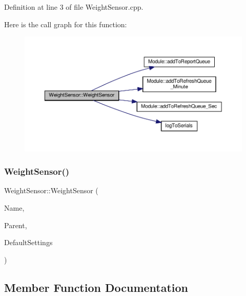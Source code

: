 Definition at line 3 of file Weight\+Sensor.\+cpp.

Here is the call graph for this function\+:
\nopagebreak
\begin{figure}[H]
\begin{center}
\leavevmode
\includegraphics[width=350pt]{class_weight_sensor_a7ea36c43abb037e5d88f6d181bd07b0d_cgraph}
\end{center}
\end{figure}
\mbox{\label{class_weight_sensor_a7ea36c43abb037e5d88f6d181bd07b0d}} 
\subsubsection{\texorpdfstring{Weight\+Sensor()}{WeightSensor()}\hspace{0.1cm}{\footnotesize\ttfamily [2/2]}}
{\footnotesize\ttfamily Weight\+Sensor\+::\+Weight\+Sensor (\begin{DoxyParamCaption}\item[{const \+\_\+\+\_\+\+Flash\+String\+Helper $\ast$}]{Name,  }\item[{\hyperlink{class_module}{Module} $\ast$}]{Parent,  }\item[{\hyperlink{struct_settings_1_1_weight_sensor_settings}{Settings\+::\+Weight\+Sensor\+Settings} $\ast$}]{Default\+Settings }\end{DoxyParamCaption})}



\subsection{Member Function Documentation}
\mbox{\label{class_weight_sensor_a7718da9f72a6f354ea19550567d42fbf}} 
